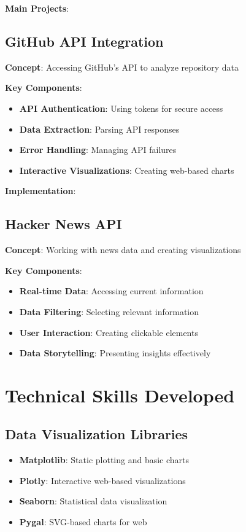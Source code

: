 \textbf{Main Projects}:

\subsection*{GitHub API Integration}
\textbf{Concept}: Accessing GitHub's API to analyze repository data

\textbf{Key Components}:
\begin{itemize}
    \item \textbf{API Authentication}: Using tokens for secure access
    \item \textbf{Data Extraction}: Parsing API responses
    \item \textbf{Error Handling}: Managing API failures
    \item \textbf{Interactive Visualizations}: Creating web-based charts
\end{itemize}

\textbf{Implementation}:


\subsection*{Hacker News API}
\textbf{Concept}: Working with news data and creating visualizations

\textbf{Key Components}:
\begin{itemize}
    \item \textbf{Real-time Data}: Accessing current information
    \item \textbf{Data Filtering}: Selecting relevant information
    \item \textbf{User Interaction}: Creating clickable elements
    \item \textbf{Data Storytelling}: Presenting insights effectively
\end{itemize}

\section*{Technical Skills Developed}

\subsection*{Data Visualization Libraries}
\begin{itemize}
    \item \textbf{Matplotlib}: Static plotting and basic charts
    \item \textbf{Plotly}: Interactive web-based visualizations
    \item \textbf{Seaborn}: Statistical data visualization
    \item \textbf{Pygal}: SVG-based charts for web
\end{itemize}

